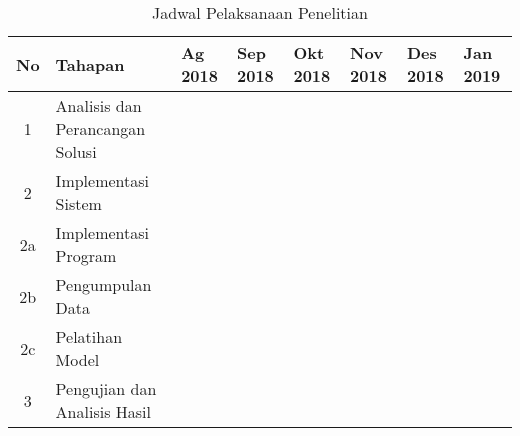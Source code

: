 \begin{table}[h]
	\centering
    \caption{Jadwal Pelaksanaan Penelitian}\label{tab-schedule}
	\begin{tabular}{ |c|l|p{5px}|p{5px}|p{5px}|p{5px}|p{5px}|p{5px}|p{5px}|p{5px}|p{5px}|p{5px}|p{5px}|p{5px}| } 
	\hline
	No & Tahapan & \multicolumn{2}{p{10px}|}{Ag 2018} & \multicolumn{2}{p{10px}|}{Sep 2018} & \multicolumn{2}{p{10px}|}{Okt 2018} & \multicolumn{2}{p{10px}|}{Nov 2018} & \multicolumn{2}{p{10px}|}{Des 2018}  & \multicolumn{2}{p{10px}|}{Jan 2019} \\
	\hline
	1 & Analisis dan Perancangan Solusi & \fillcell & \fillcell & \fillcell & \fillcell & & & & & & & & \\
	\hline
	2 & Implementasi Sistem& & & & \fillcell & \fillcell &\fillcell &\fillcell &\fillcell &\fillcell &\fillcell & & \\
	\hline
	2a & \quad Implementasi Program & & & & \fillcell & \fillcell &\fillcell &\fillcell &\fillcell &\fillcell & & & \\
	\hline
	2b & \quad Pengumpulan Data & & & & & \fillcell &\fillcell &\fillcell &\fillcell & & & & \\
	\hline
	2c & \quad Pelatihan Model & & & & &  & & & & &\fillcell & & \\
	\hline
	3 & Pengujian dan Analisis Hasil & & & & &  & & & & & &\fillcell &\fillcell \\
	\hline
	\end{tabular}
	
\end{table}